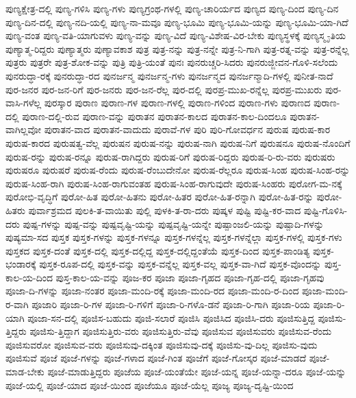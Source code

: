 {ಪುಣ್ಯಕ್ಷೇತ್ರ-ದಲ್ಲಿ
ಪುಣ್ಯ-ಗಳಿಸಿ
ಪುಣ್ಯ-ಗಳು
ಪುಣ್ಯಗ್ರಂಥ-ಗಳಲ್ಲಿ
ಪುಣ್ಯ-ಚಾರಿರ್ಯದ
ಪುಣ್ಯದ
ಪುಣ್ಯ-ದಿಂದ
ಪುಣ್ಯ-ದಿನ
ಪುಣ್ಯ-ದಿನ-ದಲ್ಲಿ
ಪುಣ್ಯ-ನದಿ-ಯಲ್ಲಿ
ಪುಣ್ಯ-ನಾ-ಮವೂ
ಪುಣ್ಯ-ಭೂಮಿ
ಪುಣ್ಯ-ಭೂಮಿ-ಯನ್ನು
ಪುಣ್ಯ-ಭೂಮಿ-ಯಾ-ಗಿದೆ
ಪುಣ್ಯ-ವಂತ
ಪುಣ್ಯ-ವತಿ-ಯಾಗುವಳು
ಪುಣ್ಯ-ವನ್ನು
ಪುಣ್ಯ-ವಿದೆ
ಪುಣ್ಯ-ವಿಶೇಷ-ವಿರ-ಬೇಕು
ಪುಣ್ಯಸ್ಥಳಕ್ಕೆ
ಪುಣ್ಯಸ್ಮೃ-ತಿಯ
ಪುಣ್ಯಾತ್ಮ-ರಿದ್ದರು
ಪುಣ್ಯಾತ್ಮರು
ಪುಣ್ಯಾವಕಾಶ
ಪುತ್ರ
ಪುತ್ರ-ನನ್ನು
ಪುತ್ರ-ನನ್ನೇ
ಪುತ್ರ-ನಿ-ಗಾಗಿ
ಪುತ್ರ-ರತ್ನ-ವನ್ನು
ಪುತ್ರ-ರನ್ನೆಲ್ಲ
ಪುತ್ರರು
ಪುತ್ರರೇ
ಪುತ್ರ-ಶೋಕ-ವನ್ನು
ಪುತ್ರಿ
ಪುತ್ರಿ-ಯಂತೆ
ಪುನಃ
ಪುನರುಚ್ಚರಿ-ಸಿದರು
ಪುನರುಜ್ಜೀವನ-ಗೊಳಿ-ಸಲೆಂದು
ಪುನರುದ್ಧಾ-ರಕ್ಕೆ
ಪುನರುದ್ಧಾ-ರದ
ಪುನರ್ಜನ್ಮ
ಪುನರ್ಜನ್ಮ-ಗಳು
ಪುನರ್ಜನ್ಮದ
ಪುನರ್ಜನ್ಮಾದಿ-ಗಳಲ್ಲಿ
ಪುನೀತ-ನಾದೆ
ಪುರ-ಜನರ
ಪುರ-ಜನ-ರಿಗೆ
ಪುರ-ಜನರು
ಪುರ-ಜನ-ರೆಲ್ಲ
ಪುರ-ದಲ್ಲಿ
ಪುರಪ್ರ-ಮುಖ-ರನ್ನೆಲ್ಲ
ಪುರಪ್ರ-ಮುಖರು
ಪುರ-ವಾಸಿ-ಗಳೆಲ್ಲ
ಪುರಸ್ಕಾರ
ಪುರಾಣ
ಪುರಾಣ-ಗಳ
ಪುರಾಣ-ಗಳಲ್ಲಿ
ಪುರಾಣ-ಗಳಿಂದ
ಪುರಾಣ-ಗಳು
ಪುರಾಣದ
ಪುರಾಣ-ದಲ್ಲಿ
ಪುರಾಣ-ದಲ್ಲಿ-ರುವ
ಪುರಾಣ-ವನ್ನು
ಪುರಾತನ
ಪುರಾತನ-ಕಾಲದ
ಪುರಾತನ-ಕಾಲ-ದಿಂದಲೂ
ಪುರಾತನ-ವಾಗಿಲ್ಲವೋ
ಪುರಾತನ-ವಾದ
ಪುರಾತನ-ವಾದುದು
ಪುರಾವೆ-ಗಳ
ಪುರಿ
ಪುರಿ-ಗೋವರ್ಧನ
ಪುರುಷ
ಪುರುಷ-ಕಾರ
ಪುರುಷ-ಕಾರದ
ಪುರುಷತ್ವ-ವೆಲ್ಲ
ಪುರುಷನ
ಪುರುಷ-ನನ್ನು
ಪುರುಷ-ನಾಗಿ
ಪುರುಷ-ನಿಗೆ
ಪುರುಷನೂ
ಪುರುಷ-ನೊಂದಿಗೆ
ಪುರುಷ-ರನ್ನು
ಪುರುಷ-ರನ್ನೂ
ಪುರುಷ-ರಾಗಿದ್ದರು
ಪುರುಷ-ರಿಗೆ
ಪುರುಷ-ರಿದ್ದರು
ಪುರುಷ-ರಿ-ರು-ವರು
ಪುರುಷರು
ಪುರುಷರೂ
ಪುರುಷರೆ
ಪುರುಷ-ರೆಂದು
ಪುರುಷ-ರೆಂಬುದೇನೋ
ಪುರುಷ-ರೆಲ್ಲರೂ
ಪುರುಷ-ಸಿಂಹ
ಪುರುಷ-ಸಿಂಹ-ರನ್ನು
ಪುರುಷ-ಸಿಂಹ-ರಾಗಿ
ಪುರುಷ-ಸಿಂಹ-ರಾಗುವಂತಹ
ಪುರುಷ-ಸಿಂಹ-ರಾಗುವುದೇ
ಪುರುಷ-ಸಿಂಹರು
ಪುರೋಗ-ಮ-ನಕ್ಕೆ
ಪುರೋಭಿ-ವೃದ್ಧಿಗೆ
ಪುರೋ-ಹಿತ
ಪುರೋ-ಹಿತನು
ಪುರೋ-ಹಿತರ
ಪುರೋ-ಹಿತ-ರನ್ನಾಗಿ
ಪುರೋ-ಹಿತ-ರನ್ನು
ಪುರೋ-ಹಿತರು
ಪುರ್ವಾಶ್ರಮದ
ಪುಲಕಿ-ತ-ವಾಯಿತು
ಪುಲ್ಲಿ
ಪುಳಕಿ-ತ-ರಾ-ದರು
ಪುಷ್ಕಳ
ಪುಷ್ಟಿ
ಪುಷ್ಟಿ-ಕರ-ವಾದ
ಪುಷ್ಟಿ-ಗೊಳಿಸಿ-ದರು
ಪುಷ್ಪ-ಗಳನ್ನು
ಪುಷ್ಪ-ವನ್ನು
ಪುಷ್ಪವೃಷ್ಟಿ-ಯನ್ನು
ಪುಷ್ಪವೃಷ್ಟಿ-ಯನ್ನೇ
ಪುಷ್ಪಾಂಜಲಿ-ಯನ್ನು
ಪುಷ್ಪಾದಿ-ಗಳನ್ನು
ಪುಷ್ಯಮಾ-ಸದ
ಪುಸ್ತಕ
ಪುಸ್ತಕ-ಗಳನ್ನು
ಪುಸ್ತಕ-ಗಳನ್ನೂ
ಪುಸ್ತಕ-ಗಳನ್ನೆಲ್ಲ
ಪುಸ್ತಕ-ಗಳನ್ನೆಲ್ಲಾ
ಪುಸ್ತಕ-ಗಳಲ್ಲಿ
ಪುಸ್ತಕ-ಗಳು
ಪುಸ್ತಕದ
ಪುಸ್ತಕ-ದಂತೆ
ಪುಸ್ತಕ-ದಲ್ಲಿ
ಪುಸ್ತಕ-ದಲ್ಲಿದ್ದ
ಪುಸ್ತಕ-ದಲ್ಲಿದ್ದಂತೆಯೆ
ಪುಸ್ತಕ-ದಿಂದ
ಪುಸ್ತಕ-ಪಾಂಡಿತ್ಯ
ಪುಸ್ತಕ-ಭಂಡಾರಕ್ಕೆ
ಪುಸ್ತಕ-ರೂಪ-ದಲ್ಲಿ
ಪುಸ್ತಕ-ವನ್ನು
ಪುಸ್ತಕ-ವನ್ನೆಲ್ಲ
ಪುಸ್ತಕ-ವಲ್ಲ
ಪುಸ್ತಕ-ವಾ-ಗಿದೆ
ಪುಸ್ತಕ-ವೊಂದನ್ನು
ಪುಸ್ತ-ಕಾಲ-ಯ-ದಿಂದ
ಪುಸ್ತ-ಕಾಲ-ಯ-ವನ್ನು
ಪೂಜ-ಕರ
ಪೂಜಾ
ಪೂಜಾ-ಗೃಹದ
ಪೂಜಾ-ಗೃಹ-ದಲ್ಲಿ
ಪೂಜಾ-ಗೃಹವು
ಪೂಜಾ-ದಿ-ಗಳನ್ನು
ಪೂಜಾ-ನಂತರ
ಪೂಜಾ-ಮಂದಿ-ರಕ್ಕೆ
ಪೂಜಾ-ಮಂದಿ-ರದ
ಪೂಜಾ-ಮಂದಿ-ರ-ದಿಂದ
ಪೂಜಾ-ಮಂದಿ-ರ-ವಾಗಿ
ಪೂಜಾರಿ
ಪೂಜಾ-ರಿ-ಗಳ
ಪೂಜಾ-ರಿ-ಗಳಿಗೆ
ಪೂಜಾ-ರಿ-ಗಳೊ-ಡನೆ
ಪೂಜಾ-ರಿ-ಗಾಗಿ
ಪೂಜಾ-ರಿಯ
ಪೂಜಾ-ರಿ-ಯಾಗಿ
ಪೂಜಾ-ಸನ-ದಲ್ಲಿ
ಪೂಜಿಸ-ಬಹುದು
ಪೂಜಿ-ಸಲಾರೆ
ಪೂಜಿಸಿ
ಪೂಜಿಸಿದ
ಪೂಜಿಸಿ-ದರು
ಪೂಜಿಸುತ್ತಿದ್ದ
ಪೂಜಿಸು-ತ್ತಿದ್ದರು
ಪೂಜಿಸು-ತ್ತಿದ್ದಾಗ
ಪೂಜಿಸುತ್ತಿರು-ವರು
ಪೂಜಿಸುತ್ತಿರು-ವೆವು
ಪೂಜಿಸುವ
ಪೂಜಿಸುವರು
ಪೂಜಿಸುವ-ರೆಂದು
ಪೂಜಿಸುವರೋ
ಪೂಜಿಸುವ-ವರು
ಪೂಜಿಸುವು-ದಕ್ಕಿಂತ
ಪೂಜಿಸುವು-ದಕ್ಕೆ
ಪೂಜಿಸು-ವು-ದಿಲ್ಲ
ಪೂಜಿಸು-ವುದು
ಪೂಜಿಸುವೆ
ಪೂಜೆ
ಪೂಜೆ-ಗಳನ್ನು
ಪೂಜೆ-ಗಳಾದ
ಪೂಜೆ-ಗಿಂತ
ಪೂಜೆಗೆ
ಪೂಜೆ-ಗೋಸ್ಕರ
ಪೂಜೆ-ಮಾಡದೆ
ಪೂಜೆ-ಮಾಡ-ಬೇಕು
ಪೂಜೆ-ಮಾಡುತ್ತಿದ್ದರು
ಪೂಜೆಯ
ಪೂಜೆ-ಯಂತೆಯೇ
ಪೂಜೆ-ಯನ್ನ
ಪೂಜೆ-ಯನ್ನಾ-ದರೂ
ಪೂಜೆ-ಯನ್ನು
ಪೂಜೆ-ಯಲ್ಲಿ
ಪೂಜೆ-ಯಾದ
ಪೂಜೆ-ಯಿಂದ
ಪೂಜೆಯೂ
ಪೂಜೆ-ಯೆಲ್ಲ
ಪೂಜ್ಯ
ಪೂಜ್ಯ-ದೃಷ್ಟಿ-ಯಿಂದ
}
